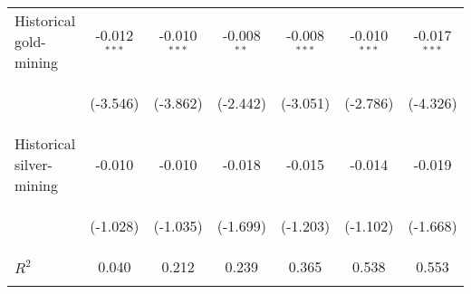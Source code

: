 \begin{center}
\begin{tabular}{lcccccc}
\noalign{\smallskip}Historical gold-mining & -0.012$ ^{***}$ & -0.010$ ^{***}$ & -0.008$ ^{**}$ & -0.008$ ^{***}$ & -0.010$ ^{***}$ & -0.017$ ^{***}$\\
 & \begin{footnotesize}(-3.546)\end{footnotesize} & \begin{footnotesize}(-3.862)\end{footnotesize} & \begin{footnotesize}(-2.442)\end{footnotesize} & \begin{footnotesize}(-3.051)\end{footnotesize} & \begin{footnotesize}(-2.786)\end{footnotesize} & \begin{footnotesize}(-4.326)\end{footnotesize}\\
\noalign{\smallskip}Historical silver-mining & -0.010 & -0.010 & -0.018 & -0.015 & -0.014 & -0.019\\
 & \begin{footnotesize}(-1.028)\end{footnotesize} & \begin{footnotesize}(-1.035)\end{footnotesize} & \begin{footnotesize}(-1.699)\end{footnotesize} & \begin{footnotesize}(-1.203)\end{footnotesize} & \begin{footnotesize}(-1.102)\end{footnotesize} & \begin{footnotesize}(-1.668)\end{footnotesize}\\
\noalign{\smallskip}$ R^2$ & 0.040 & 0.212 & 0.239 & 0.365 & 0.538 & 0.553\\
 & \begin{footnotesize}\end{footnotesize} & \begin{footnotesize}\end{footnotesize} & \begin{footnotesize}\end{footnotesize} & \begin{footnotesize}\end{footnotesize} & \begin{footnotesize}\end{footnotesize} & \begin{footnotesize}\end{footnotesize}\\

\end{tabular}
\end{center}
